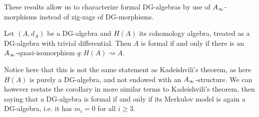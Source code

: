 These results allow us to characterize formal DG-algebras by use of $A_{\infty}$-morphisms instead of zig-zags of DG-morphisms. 


\begin{corollary}
\label{cor:formal_A_infinity-qi}
Let $(A, d_A)$ be a DG-algebra and $H(A)$ its cohomology algebra, treated as a DG-algebra with trivial differential. Then $A$ is formal if and only if there is an $A_{\infty}$-quasi-isomorphism $q\colon H(A)\rightsquigarrow A$. 
\end{corollary}

Notice here that this is not the same statement as Kadeishvili's theorem, as here $H(A)$ is purely a DG-algebra, and not endowed with an $A_{\infty}$-structure. We can however restate the corollary in more similar terms to Kadeishvili's theorem, then saying that a DG-algebra is formal if and only if its Merkulov model is again a DG-algebra, i.e. it has $m_i=0$ for all $i\geq 3$. 






